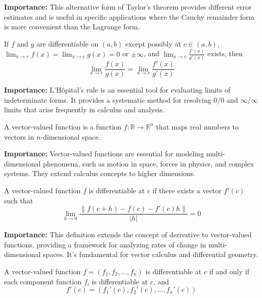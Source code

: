 \noindent\textbf{Importance:} This alternative form of Taylor's theorem provides different error estimates and is useful in specific applications where the Cauchy remainder form is more convenient than the Lagrange form.



\begin{theorem}
If $f$ and $g$ are differentiable on $(a,b)$ except possibly at $c \in (a,b)$, $\lim_{x \to c} f(x) = \lim_{x \to c} g(x) = 0$ or $\pm\infty$, and $\lim_{x \to c} \frac{f'(x)}{g'(x)}$ exists, then
\[ \lim_{x \to c} \frac{f(x)}{g(x)} = \lim_{x \to c} \frac{f'(x)}{g'(x)} \]
\end{theorem}

\noindent\textbf{Importance:} L'Hôpital's rule is an essential tool for evaluating limits of indeterminate forms. It provides a systematic method for resolving $0/0$ and $\infty/\infty$ limits that arise frequently in calculus and analysis.



\begin{definition}
A vector-valued function is a function $f: \mathbb{R} \to \mathbb{R}^n$ that maps real numbers to vectors in $n$-dimensional space.
\end{definition}

\noindent\textbf{Importance:} Vector-valued functions are essential for modeling multi-dimensional phenomena, such as motion in space, forces in physics, and complex systems. They extend calculus concepts to higher dimensions.



\begin{definition}
A vector-valued function $f$ is differentiable at $c$ if there exists a vector $f'(c)$ such that
\[ \lim_{h \to 0} \frac{\|f(c + h) - f(c) - f'(c)h\|}{|h|} = 0 \]
\end{definition}

\noindent\textbf{Importance:} This definition extends the concept of derivative to vector-valued functions, providing a framework for analyzing rates of change in multi-dimensional spaces. It's fundamental for vector calculus and differential geometry.



\begin{theorem}
A vector-valued function $f = (f_1, f_2, \ldots, f_n)$ is differentiable at $c$ if and only if each component function $f_i$ is differentiable at $c$, and
\[ f'(c) = (f_1'(c), f_2'(c), \ldots, f_n'(c)) \]
\end{theorem}

